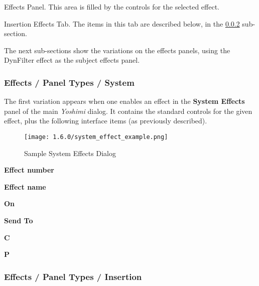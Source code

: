    Effects Panel.
   This area is filled by the controls for the selected effect.

   Insertion Effects Tab.
   The items in this tab are described below,
   in the \ref{subsubsec:effects_paneltypes_insertion}
   sub-section.



   The next sub-sections show the variations on the effects panels, using the
   DynFilter effect as the subject effects panel.

\subsubsection{Effects / Panel Types / System }
\label{subsubsec:effects_paneltypes_system}

   The first variation
   appears when one enables an effect in the
   \textbf{System Effects}
   panel of the main \textsl{Yoshimi} dialog.  It contains the standard
   controls for the given effect, plus the following interface items
   (as previously described).

\begin{figure}[H]
   \centering
   \texttt{[image: 1.6.0/system\_effect\_example.png]}
   \caption{Sample System Effects Dialog}
   \label{fig:sample_system_effects_dialog}
\end{figure}

   \begin{enumber}
      \item \textbf{Effect number}
      \item \textbf{Effect name}
      \item \textbf{On}
      \item \textbf{Send To}
      \item \textbf{C}
      \item \textbf{P}
   \end{enumber}

\subsubsection{Effects / Panel Types / Insertion }
\label{subsubsec:effects_paneltypes_insertion}

